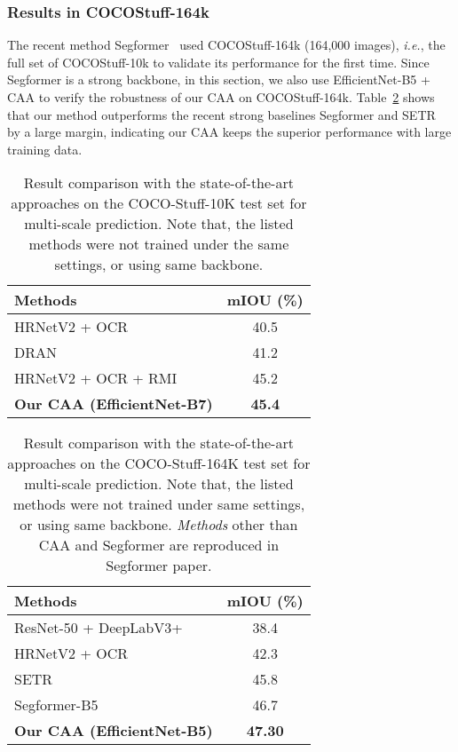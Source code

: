 \documentclass[letterpaper]{article} \usepackage{aaai22}  \usepackage{times}  \usepackage{helvet}  \usepackage{courier}  \usepackage[hyphens]{url}  \usepackage{graphicx} \urlstyle{rm} \def\UrlFont{\rm}  \usepackage{natbib}  \usepackage{caption} \DeclareCaptionStyle{ruled}{labelfont=normalfont,labelsep=colon,strut=off} \frenchspacing  \setlength{\pdfpagewidth}{8.5in}  \setlength{\pdfpageheight}{11in}  \usepackage{algorithm}
\begin{document}
\subsubsection{Results in COCOStuff-164k}

The recent method Segformer~\cite{cSegFormer} used COCOStuff-164k (164,000 images), \textit{i.e.}, the full set of COCOStuff-10k to validate its performance for the first time. Since Segformer is a strong backbone, in this section, we also use EfficientNet-B5 + CAA to verify the robustness of our CAA on COCOStuff-164k. 
Table~\ref{tabCocostuff164KFree} shows that our method outperforms the recent strong baselines Segformer and SETR~\cite{cSETR} by a large margin, indicating our CAA keeps the superior performance with large training data.





\begin{table}[t]
	\centering
	\small
	\begin{tabular}{l|c}
		\toprule[1pt]
		\rule{0pt}{2ex} Methods & mIOU (\%) \\
		\midrule[0.5pt]
		\midrule[0.5pt]
		HRNetV2 + OCR ~\cite{cSVCNet} & 40.5\\
		DRAN & 41.2 \\
		HRNetV2 + OCR + RMI & 45.2 \\
		\midrule[0.5pt]
		\textbf{Our CAA (EfficientNet-B7)} & \textbf{45.4}\\
		\bottomrule[1pt]
	\end{tabular}
	\caption{Result comparison with the state-of-the-art approaches on the COCO-Stuff-10K test set for multi-scale prediction. Note that, the listed methods were not trained under the same settings, or using same backbone. }
	\label{tabCocostuffFree}
\end{table}



\begin{table}[t]
	\centering
	\small

	\begin{tabular}{l|c}
		\toprule[1pt]
		\rule{0pt}{2ex} Methods & mIOU (\%) \\
		\midrule[0.5pt]
		\midrule[0.5pt]
		ResNet-50 + DeepLabV3+ ~\cite{cDeepLabV3Plus} & 38.4\\
		HRNetV2 + OCR & 42.3 \\
		SETR~\cite{cSETR} & 45.8\\
	    Segformer-B5~\cite{cSegFormer} & 46.7 \\
		\midrule[0.5pt]
		\textbf{Our CAA (EfficientNet-B5)} & \textbf{47.30}\\
		\bottomrule[1pt]
	\end{tabular}
	\caption{Result comparison with the state-of-the-art approaches on the COCO-Stuff-164K test set for multi-scale prediction. Note that, the listed methods were not trained under same settings, or using same backbone. \textit{Methods} other than CAA and Segformer are reproduced in Segformer paper. }
	\label{tabCocostuff164KFree}
\end{table}
\end{document}
